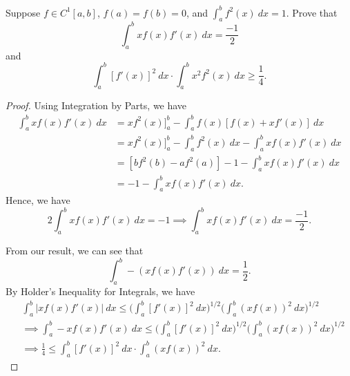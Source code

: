 \documentclass[a4paper]{article}
\begin{document}
\begin{problem}
    Suppose \( f \in C^{1}[a,b] \), \( f(a) = f(b) = 0  \), and \( \int_{ a }^{ b } f^{2}(x) \ dx  = 1  \). Prove that  
    \[  \int_{ a }^{ b } x f(x) f'(x) \ dx = \frac{ -1 }{ 2 }  \]
    and
    \[  \int_{ a }^{ b } [f'(x)]^{2} \ dx \cdot \int_{ a }^{ b }  x^{2} f^{2}(x)  \ dx \geq \frac{ 1 }{ 4 }. \]
\end{problem}
\begin{proof}
Using Integration by Parts, we have 
\begin{align*}
\int_{ a }^{ b } x f(x) f'(x) \ dx &= x f^{2}(x) \Big]_{a}^{b} - \int_{ a }^{ b }  f(x) [f(x)  + x f'(x)] \ dx  \\
                                   &= x f^{2}(x) \Big]_{a}^{b} - \int_{ a }^{ b } f^{2}(x) \ dx - \int_{ a }^{ b }  x f(x) f'(x) \ dx \\
                                   &= [ b f^{2}(b) - a f^{2}(a)] - 1 - \int_{ a }^{ b }  x f(x) f'(x)  \ dx  \\ 
                                   &= -1 - \int_{ a }^{ b }  x f(x) f'(x) \ dx.
\end{align*}
Hence, we have 
\[  2 \int_{ a }^{ b }  x f(x) f'(x) \ dx = -1 \implies \int_{ a }^{ b }  x f(x) f'(x) \ dx = \frac{ -1 }{ 2 }. \]

From our result, we can see that 
\[  \int_{ a }^{ b }  - (x f(x) f'(x))  \ dx  = \frac{ 1 }{ 2 }.  \]
By Holder's Inequality for Integrals, we have 
\begin{align*}
    &\int_{ a }^{ b }   | x f(x) f'(x) |  \ dx  \leq \Big(  \int_{ a }^{ b } [f'(x)]^{2} \ dx  \Big)^{1/2} \Big(  \int_{ a }^{ b }  (xf(x))^{2} \ dx  \Big)^{1/2}  \\
        &\implies \int_{ a }^{ b } - x f(x) f'(x) \ dx \leq \Big(  \int_{ a }^{ b }  [f'(x)]^{2}  \ dx  \Big)^{1/2} \Big(  \int_{ a }^{ b }  (xf(x))^{2} \ dx  \Big)^{1/2}  \\
        &\implies \frac{ 1 }{ 4 }  \leq \int_{ a }^{ b }  [f'(x)]^{2}  \ dx \cdot \int_{ a }^{ b }  (xf(x))^{2} \ dx.  
\end{align*}
\end{proof}
\end{document}

